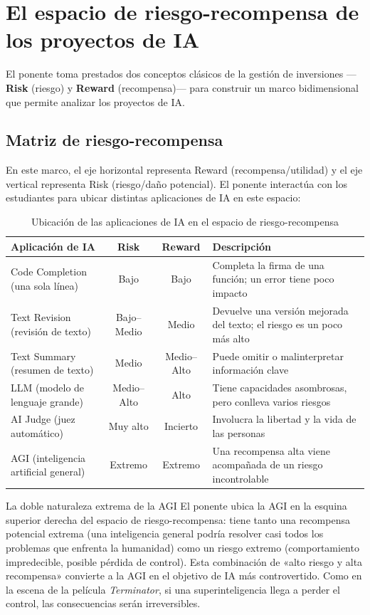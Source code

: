 \section{El espacio de riesgo-recompensa de los proyectos de IA}

El ponente toma prestados dos conceptos clásicos de la gestión de inversiones —\textbf{Risk} (riesgo) y \textbf{Reward} (recompensa)— para construir un marco bidimensional que permite analizar los proyectos de IA.

\subsection{Matriz de riesgo-recompensa}

En este marco, el eje horizontal representa Reward (recompensa/utilidad) y el eje vertical representa Risk (riesgo/daño potencial). El ponente interactúa con los estudiantes para ubicar distintas aplicaciones de IA en este espacio:

\begin{table}[H]
\centering
\caption{Ubicación de las aplicaciones de IA en el espacio de riesgo-recompensa}
\begin{tabular}{@{}lccl@{}}
\toprule
\textbf{Aplicación de IA} & \textbf{Risk} & \textbf{Reward} & \textbf{Descripción} \\
\midrule
Code Completion (una sola línea) & Bajo & Bajo & Completa la firma de una función; un error tiene poco impacto \\
Text Revision (revisión de texto) & Bajo--Medio & Medio & Devuelve una versión mejorada del texto; el riesgo es un poco más alto \\
Text Summary (resumen de texto) & Medio & Medio--Alto & Puede omitir o malinterpretar información clave \\
LLM (modelo de lenguaje grande) & Medio--Alto & Alto & Tiene capacidades asombrosas, pero conlleva varios riesgos \\
AI Judge (juez automático) & Muy alto & Incierto & Involucra la libertad y la vida de las personas \\
AGI (inteligencia artificial general) & Extremo & Extremo & Una recompensa alta viene acompañada de un riesgo incontrolable \\
\bottomrule
\end{tabular}
\end{table}

\begin{warningbox}{La doble naturaleza extrema de la AGI}
El ponente ubica la AGI en la esquina superior derecha del espacio de riesgo-recompensa: tiene tanto una recompensa potencial extrema (una inteligencia general podría resolver casi todos los problemas que enfrenta la humanidad) como un riesgo extremo (comportamiento impredecible, posible pérdida de control). Esta combinación de «alto riesgo y alta recompensa» convierte a la AGI en el objetivo de IA más controvertido. Como en la escena de la película \textit{Terminator}, si una superinteligencia llega a perder el control, las consecuencias serán irreversibles.
\end{warningbox}


